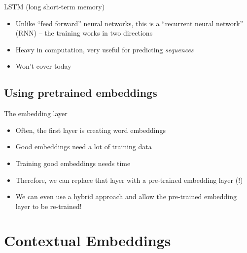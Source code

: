 \documentclass[compress]{beamer}
\begin{document}
\begin{frame}{LSTM (long short-term memory)}
	\begin{itemize}
		\item Unlike ``feed forward'' neural networks, this is  a ``recurrent neural network'' (RNN) -- the training works in two directions
		\item Heavy in computation, very useful for predicting \emph{sequences}
		\item Won't cover today
	\end{itemize}
\end{frame}


\subsection{Using pretrained embeddings}

\begin{frame}{The embedding layer}
	\begin{itemize}
		\item Often, the first layer is creating word embeddings
		\item Good embeddings need a lot of training data
		\item Training good embeddings needs time
		\item Therefore, we can replace that layer with a pre-trained embedding layer (!)
		\item We can even use a hybrid approach and allow the pre-trained embedding layer to be re-trained!
	\end{itemize}
\end{frame}

\section{Contextual Embeddings}
\end{document}
